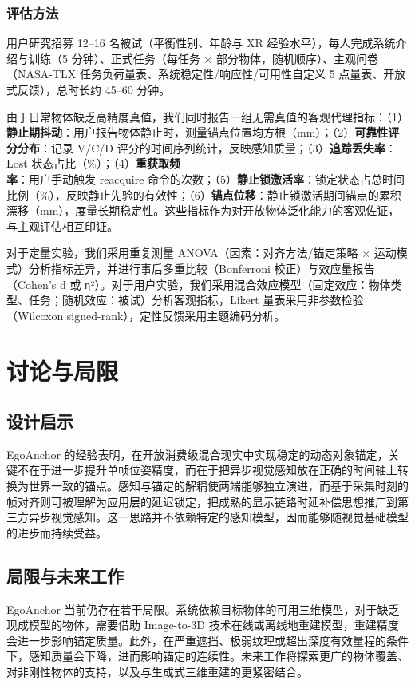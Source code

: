 \documentclass[review]{vgtc}
\begin{document}
\subsubsection{评估方法}


用户研究招募 12--16 名被试（平衡性别、年龄与 XR 经验水平），每人完成系统介绍与训练（5 分钟）、正式任务（每任务 × 部分物体，随机顺序）、主观问卷（NASA-TLX 任务负荷量表、系统稳定性/响应性/可用性自定义 5 点量表、开放式反馈），总时长约 45--60 分钟。

由于日常物体缺乏高精度真值，我们同时报告一组无需真值的客观代理指标：（1）\textbf{静止期抖动}：用户报告物体静止时，测量锚点位置均方根（mm）；（2）\textbf{可靠性评分分布}：记录 V/C/D 评分的时间序列统计，反映感知质量；（3）\textbf{追踪丢失率}：Lost 状态占比（\%）；（4）\textbf{重获取频率}：用户手动触发 reacquire 命令的次数；（5）\textbf{静止锁激活率}：锁定状态占总时间比例（\%），反映静止先验的有效性；（6）\textbf{锚点位移}：静止锁激活期间锚点的累积漂移（mm），度量长期稳定性。这些指标作为对开放物体泛化能力的客观佐证，与主观评估相互印证。

对于定量实验，我们采用重复测量 ANOVA（因素：对齐方法/锚定策略 × 运动模式）分析指标差异，并进行事后多重比较（Bonferroni 校正）与效应量报告（Cohen's d 或 η²）。对于用户实验，我们采用混合效应模型（固定效应：物体类型、任务；随机效应：被试）分析客观指标，Likert 量表采用非参数检验（Wilcoxon signed-rank），定性反馈采用主题编码分析。

\section{讨论与局限}\label{sec:discussion}


\subsection{设计启示}


EgoAnchor 的经验表明，在开放消费级混合现实中实现稳定的动态对象锚定，关键不在于进一步提升单帧位姿精度，而在于把异步视觉感知放在正确的时间轴上转换为世界一致的锚点。感知与锚定的解耦使两端能够独立演进，而基于采集时刻的帧对齐则可被理解为应用层的延迟锁定，把成熟的显示链路时延补偿思想推广到第三方异步视觉感知。这一思路并不依赖特定的感知模型，因而能够随视觉基础模型的进步而持续受益。

\subsection{局限与未来工作}


EgoAnchor 当前仍存在若干局限。系统依赖目标物体的可用三维模型，对于缺乏现成模型的物体，需要借助 Image-to-3D 技术在线或离线地重建模型，重建精度会进一步影响锚定质量。此外，在严重遮挡、极弱纹理或超出深度有效量程的条件下，感知质量会下降，进而影响锚定的连续性。未来工作将探索更广的物体覆盖、对非刚性物体的支持，以及与生成式三维重建的更紧密结合。
\end{document}
